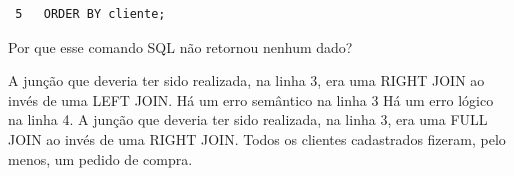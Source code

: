 \documentclass[12pt, addpoints]{exam}
\begin{document}
\begin{questions}
\begin{tcolorbox}
\begin{verbatim}
 5   ORDER BY cliente;

 \end{verbatim}

\end{tcolorbox}

Por que esse comando SQL não retornou nenhum dado?


\begin{choices}
\choice A junção que deveria ter sido realizada, na linha 3, era uma RIGHT JOIN ao invés de uma LEFT JOIN.
\choice Há um erro semântico na linha 3
\choice Há um erro lógico na linha 4.
\choice A junção que deveria ter sido realizada, na linha 3, era uma FULL JOIN ao invés de uma RIGHT JOIN.
\choice Todos os clientes cadastrados fizeram, pelo menos, um pedido de compra.
\end{choices}



    \end{questions}
    
\end{document}
